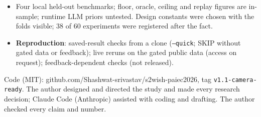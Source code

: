 \documentclass{article}
\begin{document}
\begin{minipage}[t]{0.488\linewidth}
\begin{tcolorbox}[block, title={Limitations and reproduction}]
\begin{itemize}
\item Four local held-out benchmarks; floor, oracle\ifplatformstats{}, ceiling\fi{} and replay figures are in-sample;
  runtime LLM priors untested. Design constants were chosen with the folds visible; 38 of 60 experiments were
  registered after the fact.
\item \textbf{Reproduction}: saved-result checks from a clone (\texttt{--quick}; SKIP without gated data or feedback);
  live reruns on the gated public data (access on request); feedback-dependent checks (not released).
\end{itemize}
{\fontsize{19}{23}\selectfont\color{muted} Code (MIT): github.com/Shashwat-srivastav/s2wish-paiec2026, tag
\texttt{v1.1-camera-ready}. The author designed and directed the study and made every research decision; Claude
Code (Anthropic) assisted with coding and drafting. The author checked every claim and number.\par}
\end{tcolorbox}

\end{minipage}\hfill
\end{document}
